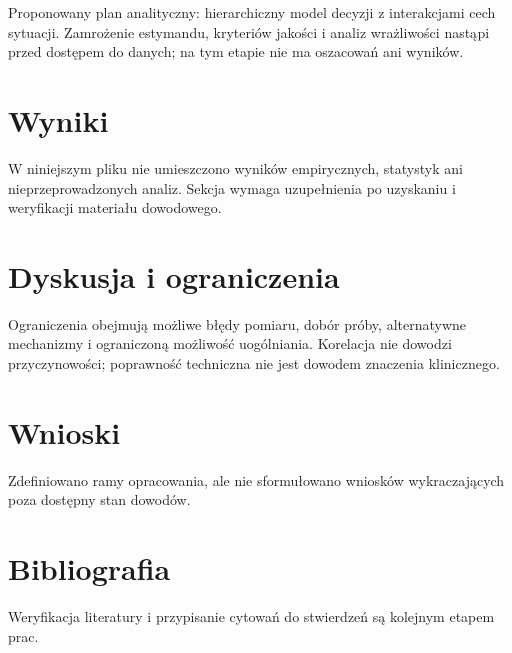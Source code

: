 \documentclass[11pt,a4paper]{article}
\begin{document}
Proponowany plan analityczny: hierarchiczny model decyzji z interakcjami cech sytuacji. Zamrożenie estymandu, kryteriów jakości i analiz wrażliwości nastąpi przed dostępem do danych; na tym etapie nie ma oszacowań ani wyników.

\section{Wyniki}

W niniejszym pliku nie umieszczono wyników empirycznych, statystyk ani nieprzeprowadzonych analiz. Sekcja wymaga uzupełnienia po uzyskaniu i weryfikacji materiału dowodowego.

\section{Dyskusja i ograniczenia}

Ograniczenia obejmują możliwe błędy pomiaru, dobór próby, alternatywne mechanizmy i ograniczoną możliwość uogólniania. Korelacja nie dowodzi przyczynowości; poprawność techniczna nie jest dowodem znaczenia klinicznego.

\section{Wnioski}

Zdefiniowano ramy opracowania, ale nie sformułowano wniosków wykraczających poza dostępny stan dowodów.

\section*{Bibliografia}

Weryfikacja literatury i przypisanie cytowań do stwierdzeń są kolejnym etapem prac.
\end{document}
